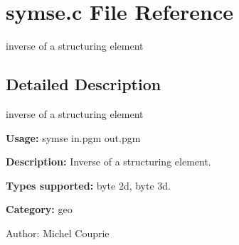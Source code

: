 \section{symse.c File Reference}
\label{symse_8c}
inverse of a structuring element  




\label{_details}
\subsection{Detailed Description}
inverse of a structuring element 

{\bf Usage:} symse in.pgm out.pgm

{\bf Description:} Inverse of a structuring element.

{\bf Types supported:} byte 2d, byte 3d.

{\bf Category:} geo

\begin{Desc}
\item[Author:]Michel Couprie \end{Desc}
